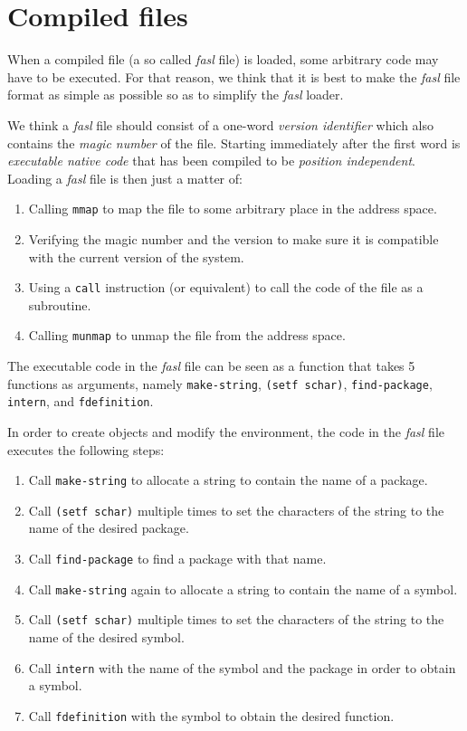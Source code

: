 \chapter{Compiled files}
\label{chap-compiled-files}

When a compiled file (a so called \emph{fasl} file) is loaded, some
arbitrary code may have to be executed.  For that reason, we think
that it is best to make the \emph{fasl} file format as simple as
possible so as to simplify the \emph{fasl} loader.

We think a \emph{fasl} file should consist of a one-word \emph{version
  identifier} which also contains the \emph{magic number} of the
file.  Starting immediately after the first word is \emph{executable
  native code} that has been compiled to be \emph{position
  independent}.  Loading a \emph{fasl} file is then just a matter of:

\begin{enumerate}
\item Calling \texttt{mmap} to map the file to some arbitrary place in
  the address space.
\item Verifying the magic number and the version to make sure it is
  compatible with the current version of the system. 
\item Using a \texttt{call} instruction (or equivalent) to call the
  code of the file as a subroutine.
\item Calling \texttt{munmap} to unmap the file from the address
  space. 
\end{enumerate}

The executable code in the \emph{fasl} file can be seen as a \cl{}
function that takes 5 functions as arguments, namely
\texttt{make-string}, \texttt{(setf schar)}, \texttt{find-package},
\texttt{intern}, and \texttt{fdefinition}.  

In order to create objects and modify the environment, the code in the
\emph{fasl} file executes the following steps:

\begin{enumerate}
\item Call \texttt{make-string} to allocate a string to contain the
  name of a package.
\item Call \texttt{(setf schar)} multiple times to set the characters
  of the string to the name of the desired package.
\item Call \texttt{find-package} to find a package with that name.
\item Call \texttt{make-string} again to allocate a string to contain
  the name of a symbol.
\item Call \texttt{(setf schar)} multiple times to set the characters
  of the string to the name of the desired symbol.
\item Call \texttt{intern} with the name of the symbol and the package
  in order to obtain a symbol.
\item Call \texttt{fdefinition} with the symbol to obtain the desired
  function. 
\end{enumerate}

